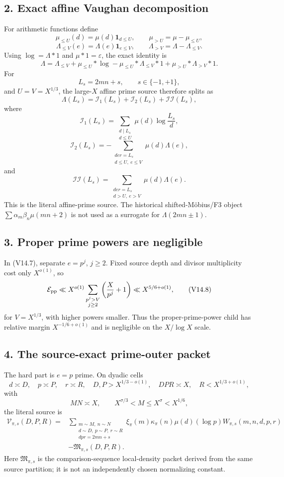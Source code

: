 \subsection*{2. Exact affine Vaughan decomposition}
For arithmetic functions define
\[
\mu_{\le U}(d)=\mu(d)\mathbf1_{d\le U},\qquad
\mu_{>U}=\mu-\mu_{\le U},
\]
\[
\Lambda_{\le V}(e)=\Lambda(e)\mathbf1_{e\le V},\qquad
\Lambda_{>V}=\Lambda-\Lambda_{\le V}.
\]
Using $\log=\Lambda*1$ and $\mu*1=\varepsilon$, the exact identity is
\[
\boxed{
\Lambda=\Lambda_{\le V}+\mu_{\le U}*\log
-\mu_{\le U}*\Lambda_{\le V}*1
+\mu_{>U}*\Lambda_{>V}*1.}
\tag{V14.3}
\]
For
\[
L_s=2mn+s,\qquad s\in\{-1,+1\},
\]
and $U=V=X^{1/3}$, the large-$X$ affine prime source therefore splits as
\[
\Lambda(L_s)=\mathcal I_1(L_s)+\mathcal I_2(L_s)+\mathcal{II}(L_s),
\tag{V14.4}
\]
where
\[
\mathcal I_1(L_s)=\sum_{\substack{d\mid L_s\\d\le U}}\mu(d)\log\frac{L_s}{d},
\tag{V14.5}
\]
\[
\mathcal I_2(L_s)=-\sum_{\substack{der=L_s\\d\le U,\ e\le V}}\mu(d)\Lambda(e),
\tag{V14.6}
\]
and
\[
\boxed{
\mathcal{II}(L_s)=\sum_{\substack{der=L_s\\d>U,\ e>V}}\mu(d)\Lambda(e).}
\tag{V14.7}
\]
This is the literal affine-prime source.  The historical shifted-M\"obius/F3 object
$\sum\alpha_m\beta_n\mu(mn+2)$ is not used as a surrogate for $\Lambda(2mn\pm1)$.

\subsection*{3. Proper prime powers are negligible}
In (V14.7), separate $e=p^j$, $j\ge2$.  Fixed source depth and divisor multiplicity cost only
$X^{o(1)}$, so
\[
\mathcal E_{\rm pp}
\ll X^{o(1)}\sum_{\substack{p^j>V\\j\ge2}}
\left(\frac{X}{p^j}+1\right)
\ll X^{5/6+o(1)},
\tag{V14.8}
\]
for $V=X^{1/3}$, with higher powers smaller.  Thus the proper-prime-power child has relative margin
$X^{-1/6+o(1)}$ and is negligible on the $X/\log X$ scale.

\subsection*{4. The source-exact prime-outer packet}
The hard part is $e=p$ prime.  On dyadic cells
\[
d\asymp D,\quad p\asymp P,\quad r\asymp R,
\quad D,P>X^{1/3-o(1)},\quad DPR\asymp X,\quad R<X^{1/3+o(1)},
\]
with
\[
MN\asymp X,\qquad X^{\sigma/3}<M\le X^\sigma<X^{1/6},
\]
the literal source is
\[
\boxed{\begin{aligned}
\mathcal V_{\pi,s}(D,P,R)
={}&\sum_{\substack{m\sim M,\ n\sim N\\d\sim D,\ p\sim P,\ r\sim R\\dpr=2mn+s}}
\xi_\pi(m)\kappa_\pi(n)\mu(d)(\log p)
W_{\pi,s}(m,n,d,p,r)\\
&-\mathfrak M_{\pi,s}(D,P,R).
\end{aligned}}
\tag{V14.9}
\]
Here $\mathfrak M_{\pi,s}$ is the comparison-sequence local-density packet derived from the same source
partition; it is not an independently chosen normalizing constant.

